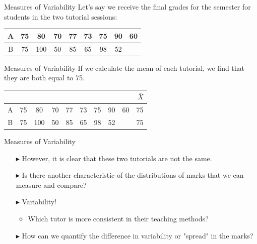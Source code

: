 \documentclass[12pt]{beamer}
\begin{document}
\begin{frame}{Measures of Variability}
Let's say we receive the final grades for the semester for students in the two tutorial sessions:

\vspace{0.5cm}

\begin{center}
	\begin{tabular}{|c|c|c|c|c|c|c|c|c|}
		\hline
		A & 75& 80 & 70 & 77 & 73 & 75 & 90 & 60\\
		\hline
		B & 75 & 100 & 50 & 85 & 65 & 98 & 52 & \\
		\hline
	\end{tabular}
\end{center}
\end{frame}
\begin{frame}{Measures of Variability}
	If we calculate the mean of each tutorial, we find that they are both equal to 75.
	
	\begin{center}
		\begin{tabular}{|c|c|c|c|c|c|c|c|c|c|}
			\multicolumn{10}{r}{$\bar{X}$} \\ 
			\hline
			A & 75& 80 & 70 & 77 & 73 & 75 & 90 & 60&75\\
			\hline
			B & 75 & 100 & 50 & 85 & 65 & 98 & 52 &&75\\
			\hline
		\end{tabular}
	\end{center}
\end{frame}
\begin{frame}{Measures of Variability}
	\begin{itemize}
		\item[$\blacktriangleright$] However, it is clear that these two tutorials are not the same.
		\item[$\blacktriangleright$] Is there another characteristic of the distributions of marks that we can measure and compare?
		\item[$\blacktriangleright$] Variability!
		\begin{itemize}
		\item Which tutor is more consistent in their teaching methods?
		\end{itemize}
		\item[$\blacktriangleright$] How can we quantify the difference in variability or "spread" in the marks?
	\end{itemize}
\end{frame}
\end{document}
